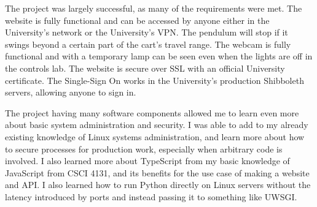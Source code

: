 \documentclass[12pt]{article}
\begin{document}
  The project was largely successful, as many of the requirements were met.
  The website is fully functional and can be accessed by anyone either in the University's network or the University's VPN.
  The pendulum will stop if it swings beyond a certain part of the cart's travel range.
  The webcam is fully functional and with a temporary lamp can be seen even when the lights are off in the controls lab.
  The website is secure over SSL with an official University certificate.
  The Single-Sign On works in the University's production Shibboleth servers, allowing anyone to sign in.

  The project having many software components allowed me to learn even more about basic system administration and security.
  I was able to add to my already existing knowledge of Linux systems administration, and learn more about how to secure processes for production work, especially when arbitrary code is involved.
  I also learned more about TypeScript from my basic knowledge of JavaScript from CSCI 4131, and its benefits for the use case of making a website and API.
  I also learned how to run Python directly on Linux servers without the latency introduced by ports and instead passing it to something like UWSGI.
\end{document}
